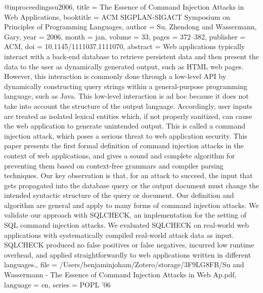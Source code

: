 @inproceedings{su2006,
  title = {The {{Essence}} of {{Command Injection Attacks}} in {{Web Applications}}},
  booktitle = {{{ACM SIGPLAN}}-{{SIGACT}} Symposium on {{Principles}} of Programming Languages},
  author = {Su, Zhendong and Wassermann, Gary},
  year = {2006},
  month = jan,
  volume = {33},
  pages = {372--382},
  publisher = {{ACM}},
  doi = {10.1145/1111037.1111070},
  abstract = {Web applications typically interact with a back-end database to retrieve persistent data and then present the data to the user as dynamically generated output, such as HTML web pages. However, this interaction is commonly done through a low-level API by dynamically constructing query strings within a general-purpose programming language, such as Java. This low-level interaction is ad hoc because it does not take into account the structure of the output language. Accordingly, user inputs are treated as isolated lexical entities which, if not properly sanitized, can cause the web application to generate unintended output. This is called a command injection attack, which poses a serious threat to web application security. This paper presents the first formal definition of command injection attacks in the context of web applications, and gives a sound and complete algorithm for preventing them based on context-free grammars and compiler parsing techniques. Our key observation is that, for an attack to succeed, the input that gets propagated into the database query or the output document must change the intended syntactic structure of the query or document. Our definition and algorithm are general and apply to many forms of command injection attacks. We validate our approach with SQLCHECK, an implementation for the setting of SQL command injection attacks. We evaluated SQLCHECK on real-world web applications with systematically compiled real-world attack data as input. SQLCHECK produced no false positives or false negatives, incurred low runtime overhead, and applied straightforwardly to web applications written in different languages.},
  file = {/Users/benjaminjoham/Zotero/storage/3F9LG8FB/Su and Wassermann - The Essence of Command Injection Attacks in Web Ap.pdf},
  language = {en},
  series = {{{POPL}} '06}
}

